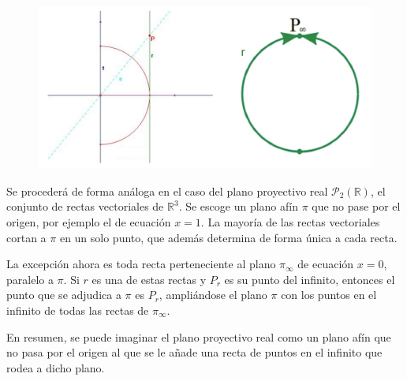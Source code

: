 \documentclass[12pt]{report}
\theoremstyle{definition}
\theoremstyle{definition}
\theoremstyle{remark}
\newcommand{\R}{\mathbb R}
\begin{document}
\begin{figure}[h]
\includegraphics[scale = 0.54]{1.2_1}
\centering
\end{figure}

Se procederá de forma análoga en el caso del plano proyectivo real $\mathcal{P}_2(\R)$, el conjunto de rectas vectoriales de $\R^3$. Se escoge un plano afín $\pi$ que no pase por el origen, por ejemplo el de ecuación $x= 1$. La mayoría de las rectas vectoriales cortan a $\pi$ en un solo punto, que además determina de forma única a cada recta. 

\vspace{2mm}
La excepción ahora es toda recta perteneciente al plano $\pi_\infty$ de ecuación $x = 0$, paralelo a $\pi$. Si $r$ es una de estas rectas y $P_r$ es su punto del infinito, entonces el punto que se adjudica a $\pi$ es $P_r$, ampliándose el plano $\pi$ con los puntos en el infinito de todas las rectas de $\pi_\infty$.

\vspace{2mm}
En resumen, se puede imaginar el plano proyectivo real como un plano afín que no pasa por el origen al que se le añade una recta de puntos en el infinito que rodea a dicho plano.
\end{document}
